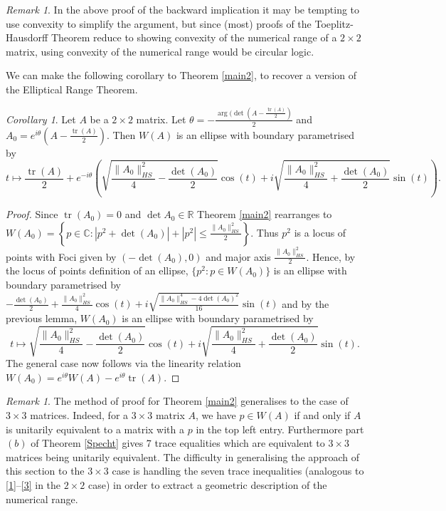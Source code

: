 \documentclass[12pt]{article}
\theoremstyle{plain}
\theoremstyle{definition}
\theoremstyle{remark}
\newcommand{\tr}{\operatorname{tr}}
\newtheorem{Corollary}[Theorem]{Corollary}
\newtheorem{Remark}[Theorem]{Remark}
\numberwithin{equation}{section}
\begin{document}
\begin{Remark}
    In the above proof of the backward implication it may be tempting to use convexity to simplify the argument, but since (most) proofs of the Toeplitz-Hausdorff Theorem reduce to showing convexity of the numerical range of a $2 \times 2$ matrix, using convexity of the numerical range would be circular logic. 
\end{Remark}


We can make the following corollary to Theorem \ref{main2}, to recover a version of the Elliptical Range Theorem.

\begin{Corollary}
Let $A$ be a $ 2 \times 2$ matrix. Let $\theta = - \frac{\operatorname{arg}(\det (A - \frac{\operatorname{tr}(A)}{2})}{2} $ and $A_0 = e^{i \theta}(A - \frac{\operatorname{tr}(A)}{2})$. Then $W(A)$ is an ellipse with boundary parametrised by 
$$
t \mapsto \frac{\operatorname{tr}(A)}{2} +  e^{-i\theta}\left(\sqrt{\frac{\|A_0\|_{HS}^2}{4} - \frac{\det(A_0)}{2}} \cos(t) + i \sqrt{\frac{\|A_0\|_{HS}^2}{4} + \frac{\det(A_0)}{2}} \sin(t)\right).
$$ 
\end{Corollary}
\begin{proof}
Since $\operatorname{tr}(A_0) = 0$ and $\det A_0 \in \mathbb{R}$ Theorem \ref{main2} rearranges to $ W(A_0) = \left\{ p \in \mathbb{C} : |p^2 + \det(A_0)| + |p^2| \leqslant \frac{\|A_0\|_{HS}^2}{2} \right\}$. Thus $p^2$ is a locus of points with Foci given by $(- \det(A_0), 0)$ and major axis $\frac{\|A_0\|_{HS}^2}{2}$. Hence, by the locus of points definition of an ellipse,  $\{ p^2 : p \in W(A_0) \}$ is an ellipse with boundary parametrised by $-\frac{\det(A_0)}{2} + \frac{\|A_0\|_{HS}^2}{4} \cos(t) + i \sqrt{\frac{\|A_0\|_{HS}^4 - 4\det(A_0)^2}{16}} \sin(t)$ and by the previous lemma, $W(A_0)$ is an ellipse with boundary parametrised by 
$$
t \mapsto \sqrt{\frac{\|A_0\|_{HS}^2}{4} - \frac{\det(A_0)}{2}} \cos(t) + i \sqrt{\frac{\|A_0\|_{HS}^2}{4} + \frac{\det(A_0)}{2}} \sin(t).
$$
The general case now follows via the linearity relation $W(A_0) = e^{i \theta}W(A) - e^{i \theta}\tr(A)$.
\end{proof}



\begin{Remark}
    The method of proof for Theorem \ref{main2} generalises to the case of $3 \times 3$ matrices. Indeed, for a $3 \times 3$ matrix $A$, we have $p \in W(A)$ if and only if $A$ is unitarily equivalent to a matrix with a $p$ in the top left entry. Furthermore part $(b)$ of Theorem \ref{Specht} gives 7 trace equalities which are equivalent to $3 \times 3$ matrices being unitarily equivalent. The difficulty in generalising the approach of this section to the $ 3 \times 3$ case is handling the seven trace inequalities (analogous to \eqref{1}--\eqref{3} in the \(2\times 2\) case) in order to extract a geometric description of the numerical range.
 
\end{Remark}
\end{document}

